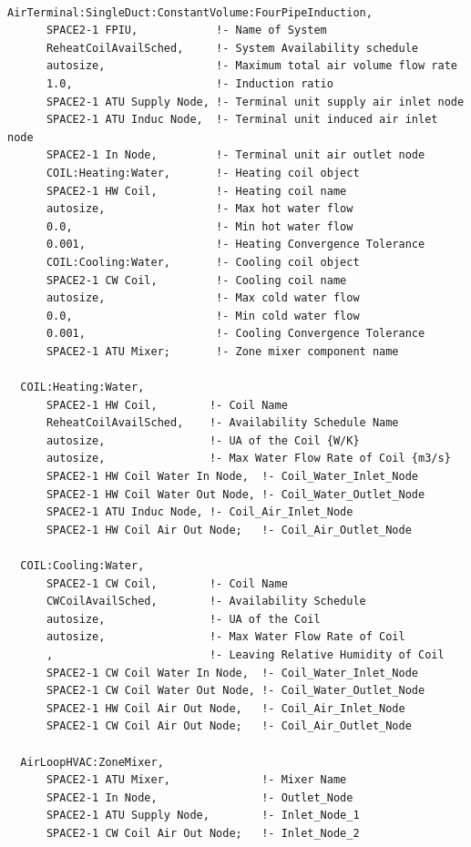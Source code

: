 \begin{lstlisting}

AirTerminal:SingleDuct:ConstantVolume:FourPipeInduction,
      SPACE2-1 FPIU,            !- Name of System
      ReheatCoilAvailSched,     !- System Availability schedule
      autosize,                 !- Maximum total air volume flow rate
      1.0,                      !- Induction ratio
      SPACE2-1 ATU Supply Node, !- Terminal unit supply air inlet node
      SPACE2-1 ATU Induc Node,  !- Terminal unit induced air inlet node
      SPACE2-1 In Node,         !- Terminal unit air outlet node
      COIL:Heating:Water,       !- Heating coil object
      SPACE2-1 HW Coil,         !- Heating coil name
      autosize,                 !- Max hot water flow
      0.0,                      !- Min hot water flow
      0.001,                    !- Heating Convergence Tolerance
      COIL:Cooling:Water,       !- Cooling coil object
      SPACE2-1 CW Coil,         !- Cooling coil name
      autosize,                 !- Max cold water flow
      0.0,                      !- Min cold water flow
      0.001,                    !- Cooling Convergence Tolerance
      SPACE2-1 ATU Mixer;       !- Zone mixer component name

  COIL:Heating:Water,
      SPACE2-1 HW Coil,        !- Coil Name
      ReheatCoilAvailSched,    !- Availability Schedule Name
      autosize,                !- UA of the Coil {W/K}
      autosize,                !- Max Water Flow Rate of Coil {m3/s}
      SPACE2-1 HW Coil Water In Node,  !- Coil_Water_Inlet_Node
      SPACE2-1 HW Coil Water Out Node, !- Coil_Water_Outlet_Node
      SPACE2-1 ATU Induc Node, !- Coil_Air_Inlet_Node
      SPACE2-1 HW Coil Air Out Node;   !- Coil_Air_Outlet_Node

  COIL:Cooling:Water,
      SPACE2-1 CW Coil,        !- Coil Name
      CWCoilAvailSched,        !- Availability Schedule
      autosize,                !- UA of the Coil
      autosize,                !- Max Water Flow Rate of Coil
      ,                        !- Leaving Relative Humidity of Coil
      SPACE2-1 CW Coil Water In Node,  !- Coil_Water_Inlet_Node
      SPACE2-1 CW Coil Water Out Node, !- Coil_Water_Outlet_Node
      SPACE2-1 HW Coil Air Out Node,   !- Coil_Air_Inlet_Node
      SPACE2-1 CW Coil Air Out Node;   !- Coil_Air_Outlet_Node

  AirLoopHVAC:ZoneMixer,
      SPACE2-1 ATU Mixer,              !- Mixer Name
      SPACE2-1 In Node,                !- Outlet_Node
      SPACE2-1 ATU Supply Node,        !- Inlet_Node_1
      SPACE2-1 CW Coil Air Out Node;   !- Inlet_Node_2
\end{lstlisting}

